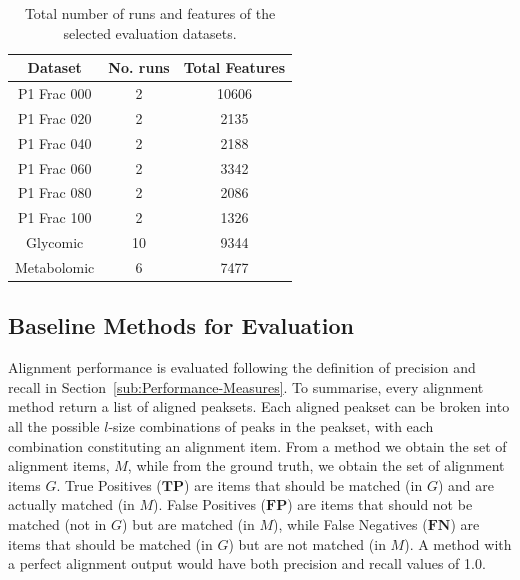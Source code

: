 \begin{table}[!htbp]
\begin{centering}
\begin{tabular}{|c|c|c|}
\hline 
Dataset & No. runs & Total Features\tabularnewline
\hline 
\hline 
P1 Frac 000 & 2 & 10606\tabularnewline
\hline 
P1 Frac 020 & 2 & 2135\tabularnewline
\hline 
P1 Frac 040 & 2 & 2188\tabularnewline
\hline 
P1 Frac 060 & 2 & 3342\tabularnewline
\hline 
P1 Frac 080 & 2 & 2086\tabularnewline
\hline 
P1 Frac 100 & 2 & 1326\tabularnewline
\hline 
Glycomic & 10 & 9344\tabularnewline
\hline 
Metabolomic & 6 & 7477\tabularnewline
\hline 
\end{tabular}
\par\end{centering}

\caption{Total number of runs and features of the selected evaluation datasets. \label{tab:hdp-datasets}}
\end{table}

\subsection{Baseline Methods for Evaluation}

Alignment performance is evaluated following the definition of precision and recall in Section~\ref{sub:Performance-Measures}. To summarise, every alignment method return a list of aligned peaksets. Each aligned peakset can be broken into all the possible $l$-size combinations of peaks in the peakset, with each combination constituting an alignment item. From a method we obtain the set of alignment items, $M$, while from the ground truth, we obtain the set of alignment items $G$. True Positives ($\boldsymbol{TP}$) are items that should be matched (in $G$) and are actually matched (in $M$). False Positives ($\boldsymbol{FP}$) are items that should not be matched (not in $G$) but are matched (in $M$), while False Negatives ($\boldsymbol{FN}$) are items that should be matched (in $G$) but are not matched (in $M$). A method with a perfect alignment output would have both precision and recall values of 1.0. 

